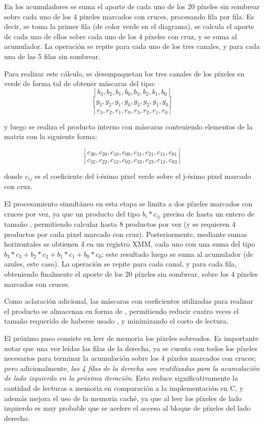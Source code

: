 En los acumuladores se suma el aporte de cada uno de los 20 píxeles sin sombrear sobre cada uno de los 4 píxeles marcados con cruces, procesando fila por fila. Es decir, se toma la primer fila (de color verde en el diagrama), se calcula el aporte de cada uno de ellos sobre cada uno de los 4 píxeles con cruz, y se suma al acumulador. La operación se repite para cada uno de los tres canales, y para cada una de las 5 filas sin sombrear.

Para realizar este cálculo, se desempaquetan los tres canales de los píxeles en verde de forma tal de obtener máscaras del tipo:
$$[b_3, b_2, b_1, b_0, b_3, b_2, b_1, b_0]$$
$$[g_3, g_2, g_1, g_0, g_3, g_2, g_1, g_0]$$
$$[r_3, r_2, r_1, r_0, r_3, r_2, r_1, r_0]$$

y luego se realiza el producto interno con máscaras conteniendo elementos de la matriz con la siguiente forma:

$$[c_{30}, c_{20}, c_{10}, c_{00}, c_{31}, c_{21}, c_{11}, c_{01}]$$
$$[c_{32}, c_{22}, c_{12}, c_{02}, c_{33}, c_{23}, c_{13}, c_{03}]$$

donde $c_{ij}$ es el coeficiente del i-ésimo pixel verde sobre el j-ésimo pixel marcado con cruz.

El procesamiento simultáneo en esta etapa se limita a dos píxeles marcados con cruces por vez, ya que un producto del tipo $b_i * c_{ij}$ precisa de hasta un entero de tamaño , permitiendo calcular hasta 8 productos por vez (y se requieren 4 productos por cada pixel marcado con cruz). Posteriormente, mediante sumas horizontales se obtienen 4  en un registro XMM, cada uno con una suma del tipo $b_3 * c_3 + b_2 * c_2 + b_1 * c_1 + b_0 * c_0$; este resultado luego se suma al acumulador (de azules, este caso). La operación se repite para cada canal, y para cada fila, obteniendo finalmente el aporte de los 20 píxeles sin sombrear, sobre los 4 píxeles marcados con cruces.

Como aclaración adicional, las máscaras con coeficientes utilizadas para realizar el producto se almacenan en forma de , permitiendo reducir cuatro veces el tamaño requerido de haberse usado , y minimizando el costo de lectura.

El próximo paso consiste en leer de memoria los píxeles sobreados. Es importante notar que una vez leídas las filas de la derecha, ya se cuenta con todos los píxeles necesarios para terminar la acumulación sobre los 4 píxeles marcados con cruces; pero adicionalmente, \emph{las 4 filas de la derecha son reutilizadas para la acumulación de lado izquierdo en la próxima iteración}. Esto reduce significativamente la cantidad de lecturas a memoria en comparación a la implementación en C, y además mejora el uso de la memoria caché, ya que al leer los píxeles de lado izquierdo es muy probable que se acelere el acceso al bloque de píxeles del lado derecho.

